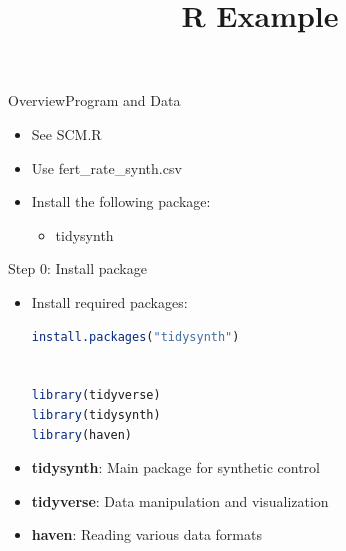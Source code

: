 \documentclass[hyperref={pdfpagelabels=false}]{beamer}
\begin{document}
\title[]  
{R Example}


\author 
{}

\institute{}






\date
{}


\begin{frame}{}
\titlepage
\end{frame}




\begin{frame}{Overview}{Program and Data}
\begin{itemize}
	\item See SCM.R
	\vspace{0.2cm}
	\item Use fert\_rate\_synth.csv
	\vspace{0.2cm}
	\item Install the following package:
	\begin{itemize}
		\vspace{0.2cm}
		\item tidysynth 
		
		
	\end{itemize}
	
\end{itemize}
\end{frame}



\begin{frame}[fragile]{Step 0: Install package}
\begin{itemize}
	\item Install required packages:
	\vspace{0.2cm}
\begin{lstlisting}[language=R, style=r-style]
install.packages("tidysynth")


library(tidyverse)
library(tidysynth)
library(haven)
\end{lstlisting}
	\item \textbf{tidysynth}: Main package for synthetic control
	\item \textbf{tidyverse}: Data manipulation and visualization
	\item \textbf{haven}: Reading various data formats
\end{itemize}
\end{frame}
\end{document}
